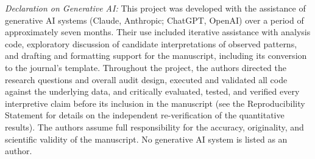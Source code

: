 \documentclass[conference, letterpaper]{IEEEtran}
\begin{document}
\textit{Declaration on Generative AI:} This project was developed with the assistance of generative AI systems (Claude, Anthropic; ChatGPT, OpenAI) over a period of approximately seven months. Their use included iterative assistance with analysis code, exploratory discussion of candidate interpretations of observed patterns, and drafting and formatting support for the manuscript, including its conversion to the journal's template. Throughout the project, the authors directed the research questions and overall audit design, executed and validated all code against the underlying data, and critically evaluated, tested, and verified every interpretive claim before its inclusion in the manuscript (see the Reproducibility Statement for details on the independent re-verification of the quantitative results). The authors assume full responsibility for the accuracy, originality, and scientific validity of the manuscript. No generative AI system is listed as an author.



\end{document}
